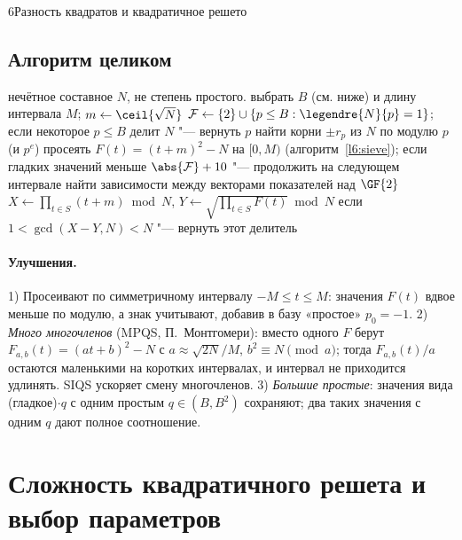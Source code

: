\begin{lecture}{6}{Разность квадратов и квадратичное решето}

\subsection{Алгоритм целиком}

\begin{algorithm}\label{l6:qs}
\begin{algorithmic}[1]
\Require нечётное составное $N$, не степень простого.
\State выбрать $B$ (см. ниже) и длину интервала $M$; $m \gets \ceil{\sqrt N}$
\State $\mathcal F \gets \{2\} \cup \{p \le B : \legendre{N}{p} = 1\}$; если некоторое $p \le B$
  делит $N$ "--- вернуть $p$
  \State найти корни $\pm r_p$ из $N$ по модулю $p$ (и $p^e$)
\EndFor
\State просеять $F(t) = (t + m)^2 - N$ на $[0, M)$ (алгоритм~\ref{l6:sieve}); если гладких
  значений меньше $\abs{\mathcal F} + 10$ "--- продолжить на следующем интервале
\State найти зависимости между векторами показателей над $\GF{2}$
  \State $X \gets \prod_{t \in S} (t + m) \bmod N$, $Y \gets \sqrt{\prod_{t \in S} F(t)} \bmod N$
  \State если $1 < \gcd(X - Y, N) < N$ "--- вернуть этот делитель
\EndFor
\end{algorithmic}
\end{algorithm}

\paragraph{Улучшения.} 1) Просеивают по симметричному интервалу $-M \le t \le M$: значения $F(t)$
вдвое меньше по модулю, а знак учитывают, добавив в базу «простое» $p_0 = -1$. 2) \emph{Много
многочленов} (MPQS, П.~Монтгомери): вместо одного $F$ берут $F_{a,b}(t) = (at + b)^2 - N$ с
$a \approx \sqrt{2N}/M$, $b^2 \equiv N \pmod a$; тогда $F_{a,b}(t)/a$ остаются маленькими на
коротких интервалах, и интервал не приходится удлинять. SIQS ускоряет смену многочленов.
3) \emph{Большие простые}: значения вида (гладкое)$\cdot q$ с одним простым $q \in (B, B^2)$
сохраняют; два таких значения с одним $q$ дают полное соотношение.


\section{Сложность квадратичного решета и выбор параметров}


\end{lecture}
